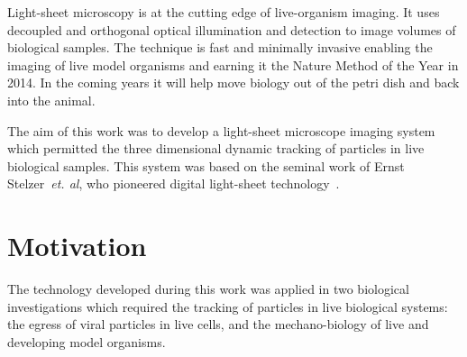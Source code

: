 
Light-sheet microscopy is at the cutting edge of live-organism imaging.
It uses decoupled and orthogonal optical illumination and detection to image volumes of biological samples.
The technique is fast and minimally invasive enabling the imaging of live model organisms and earning it the Nature Method of the Year in 2014.
In the coming years it will help move biology out of the petri dish and back into the animal.

The aim of this work was to develop a \gls{light-sheet} microscope imaging system which permitted the three dimensional dynamic tracking of particles in live biological samples.
This system was based on the seminal work of Ernst Stelzer~\emph{et. al}, who pioneered digital \gls{light-sheet} technology~\cite{huisken_optical_2004}.

\pagebreak

\section{Motivation}
The technology developed during this work was applied in two biological investigations which required the tracking of particles in live biological systems: the egress of viral particles in live cells, and the mechano-biology of live and developing model organisms.


